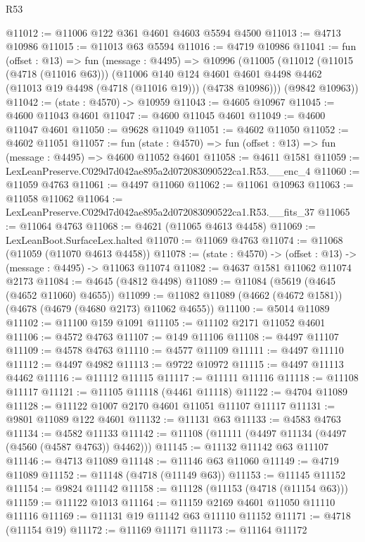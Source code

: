 \begin{lexlean}{R53}
\begin{coremodule}
@11012 := @11006 @122 @361 @4601 @4603 @5594 @4500
@11013 := @4713 @10986
@11015 := @11013 @63 @5594
@11016 := @4719 @10986
@11041 := fun (offset : @13) =>
  fun (message : @4495) =>
  @10996
    (@11005
      (@11012
        (@11015 (@4718 (@11016 @63)))
        (@11006
          @140
          @124
          @4601
          @4601
          @4498
          @4462
          (@11013 @19 @4498 (@4718 (@11016 @19)))
          (@4738 @10986)))
      (@9842 @10963))
@11042 := (state : @4570) -> @10959
@11043 := @4605 @10967
@11045 := @4600 @11043 @4601
@11047 := @4600 @11045 @4601
@11049 := @4600 @11047 @4601
@11050 := @9628 @11049
@11051 := @4602 @11050
@11052 := @4602 @11051
@11057 := fun (state : @4570) => fun (offset : @13) => fun (message : @4495) => @4600 @11052 @4601
@11058 := @4611 @1581
@11059 := LexLeanPreserve.C029d7d042ae895a2d072083090522ca1.R53.__enc_4
@11060 := @11059 @4763
@11061 := @4497 @11060
@11062 := @11061 @10963
@11063 := @11058 @11062
@11064 := LexLeanPreserve.C029d7d042ae895a2d072083090522ca1.R53.__fits_37
@11065 := @11064 @4763
@11068 := @4621 (@11065 @4613 @4458)
@11069 := LexLeanBoot.SurfaceLex.halted
@11070 := @11069 @4763
@11074 := @11068 (@11059 (@11070 @4613 @4458))
@11078 := (state : @4570) -> (offset : @13) -> (message : @4495) -> @11063 @11074
@11082 := @4637 @1581 @11062 @11074 @2173
@11084 := @4645 (@4812 @4498)
@11089 := @11084 (@5619 (@4645 (@4652 @11060) @4655))
@11099 := @11082 @11089 (@4662 (@4672 @1581)) (@4678 (@4679 (@4680 @2173) @11062 @4655))
@11100 := @5014 @11089
@11102 := @11100 @159 @1091
@11105 := @11102 @2171 @11052 @4601
@11106 := @4572 @4763
@11107 := @149 @11106
@11108 := @4497 @11107
@11109 := @4578 @4763
@11110 := @4577 @11109
@11111 := @4497 @11110
@11112 := @4497 @4982
@11113 := @9722 @10972
@11115 := @4497 @11113 @4462
@11116 := @11112 @11115
@11117 := @11111 @11116
@11118 := @11108 @11117
@11121 := @11105 @11118 (@4461 @11118)
@11122 := @4704 @11089
@11128 := @11122 @1007 @2170 @4601 @11051 @11107 @11117
@11131 := @9801 @11089 @122 @4601
@11132 := @11131 @63
@11133 := @4583 @4763
@11134 := @4582 @11133
@11142 := @11108 (@11111 (@4497 @11134 (@4497 (@4560 (@4587 @4763)) @4462)))
@11145 := @11132 @11142 @63 @11107
@11146 := @4713 @11089
@11148 := @11146 @63 @11060
@11149 := @4719 @11089
@11152 := @11148 (@4718 (@11149 @63))
@11153 := @11145 @11152
@11154 := @9824 @11142
@11158 := @11128 (@11153 (@4718 (@11154 @63)))
@11159 := @11122 @1013
@11164 := @11159 @2169 @4601 @11050 @11110 @11116
@11169 := @11131 @19 @11142 @63 @11110 @11152
@11171 := @4718 (@11154 @19)
@11172 := @11169 @11171
@11173 := @11164 @11172

\end{coremodule}
\end{lexlean}
